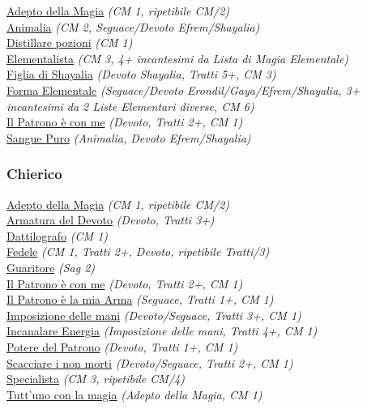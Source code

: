 \begin{multicols}{3}
{\begin{flushleft}
\hyperlink{Adepto della Magia}{Adepto della Magia} \textit{(CM 1, ripetibile CM/2)}\\
\hyperlink{Animalia}{Animalia} \textit{(CM 2, Seguace/Devoto Efrem/Shayalia)}\\
\hyperlink{Distillare pozioni}{Distillare pozioni} \textit{(CM 1)}\\
\hyperlink{Elementalista}{Elementalista} \textit{(CM 3, 4+ incantesimi da Lista di Magia Elementale)}\\
\hyperlink{Figlia di Shayalia}{Figlia di Shayalia} \textit{(Devoto Shayalia, Tratti 5+, CM 3)}\\
\hyperlink{Forma Elementale}{Forma Elementale} \textit{(Seguace/Devoto Erondil/Gaya/Efrem/Shayalia, 3+ incantesimi da 2 Liste Elementari diverse, CM 6)}\\
\hyperlink{Il Patrono è con me}{Il Patrono è con me} \textit{(Devoto, Tratti 2+, CM 1)}\\
\hyperlink{Sangue Puro}{Sangue Puro} \textit{(Animalia, Devoto Efrem/Shayalia)}\\

\titlespacing*{\subsubsection}{0pt}{0.5em}{0.5em}\subsubsection*{Chierico}

\hyperlink{Adepto della Magia}{Adepto della Magia} \textit{(CM 1, ripetibile CM/2)}\\
\hyperlink{Armatura del Devoto}{Armatura del Devoto} \textit{(Devoto, Tratti 3+)}\\
\hyperlink{Dattilografo}{Dattilografo} \textit{(CM 1)}\\
\hyperlink{Fedele}{Fedele} \textit{(CM 1, Tratti 2+, Devoto, ripetibile Tratti/3)}\\
\hyperlink{Guaritore}{Guaritore} \textit{(Sag 2)}\\
\hyperlink{Il Patrono è con me}{Il Patrono è con me} \textit{(Devoto, Tratti 2+, CM 1)}\\
\hyperlink{Il Patrono è la mia Arma}{Il Patrono è la mia Arma} \textit{(Seguace, Tratti 1+, CM 1)}\\
\hyperlink{Imposizione delle mani}{Imposizione delle mani} \textit{(Devoto/Seguace, Tratti 3+, CM 1)}\\
\hyperlink{Incanalare Energia}{Incanalare Energia} \textit{(Imposizione delle mani, Tratti 4+, CM 1)}\\
\hyperlink{Potere del Patrono}{Potere del Patrono} \textit{(Devoto, Tratti 1+, CM 1)}\\
\hyperlink{Scacciare i non morti}{Scacciare i non morti} \textit{(Devoto/Seguace, Tratti 2+, CM 1)}\\
\hyperlink{Specialista}{Specialista} \textit{(CM 3, ripetibile CM/4)}\\
\hyperlink{Tutt'uno con la magia}{Tutt'uno con la magia} \textit{(Adepto della Magia, CM 1)}\\


\end{flushleft}}
\end{multicols}
